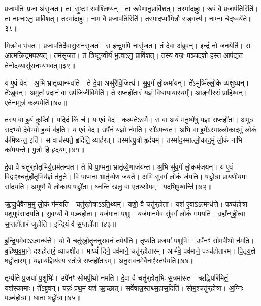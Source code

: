 प्र॒जा\-प॑तिः प्र॒जा अ॑\-सृजत।
ताः सृ॒ष्टाः सम॑श्लिष्यन्।
ता रू॒पेणानु॒प्रावि॑शत्।
तस्मा॑दाहुः।
रू॒पं वै प्र॒जा\-प॑ति॒रिति॑।
ता नाम्नाऽनु॒ प्रावि॑शत्।
तस्मा॑दाहुः।
नाम॒ वै प्र॒जा\-प॑ति॒रिति॑।
तस्मा॒दप्या॑मि॒त्रौ स॒ङ्गत्य॑।
नाम्ना॒ चेद्‌ध्वये॑ते॥३८॥\ip

मि॒त्रमे॒व भ॑वतः।
प्र॒जा\-प॑तिर्देवासु॒रान॑\-सृजत।
स इन्द्र॒मपि॒ नासृ॑जत।
तं दे॒वा अ॑ब्रुवन्।
इन्द्रं॑ नो जन॒येति॑।
स आ॒त्मन्निन्द्र॑मपश्यत्।
तम॑\-सृजत।
तं त्रि॒ष्टुग्वी॒र्यं॑ भू॒त्वाऽनु॒ प्रावि॑शत्।
तस्य॒ वज्रः॑ पञ्चद॒शो हस्त॒ आप॑द्यत।
तेनो॒दय्यासु॑रान॒भ्य॑भवत्॥३९॥\ip

य ए॒वं वेद॑।
अ॒भि भ्रातृ॑व्यान्भवति।
ते दे॒वा असु॑रैर्वि॒जित्य॑।
सु॒व॒र्गं लो॒कमा॑यन्।
ते॑ऽमुष्मिँ॑ल्लो॒के व्य॑क्षुध्यन्।
ते᳚ऽब्रुवन्।
अ॒मुतः॑ प्रदानं॒ वा उप॑जिजीवि॒मेति॑।
ते स॒प्तहो॑तारं य॒ज्ञं वि॒धाया॒यास्यम्᳚।
आ॒ङ्गी॒र॒सं प्राहि॑ण्वन्।
ए॒तेना॒मुत्र॑ कल्प॒येति॑॥४०॥\ip

तस्य॒ वा इ॒यं कॢप्तिः॑।
यदि॒दं किं च॑।
य ए॒वं वेद॑।
कल्प॑ते\-ऽस्मै।
स वा अ॒यं म॑नु॒ष्ये॑षु य॒ज्ञः स॒प्तहो॑ता।
अ॒मुत्र॑ स॒द्भ्यो दे॒वेभ्यो॑ ह॒व्यं व॑हति।
य ए॒वं वेद॑।
उपै॑नं य॒ज्ञो न॑मति।
सो॑ऽमन्यत।
अ॒भि वा इ॒मे᳚\-ऽस्माल्लो॒काद॒मुं लो॒कं क॑मिष्यन्त॒ इति॑।
स वाच॑स्पते॒ हृदिति॒ व्याह॑रत्।
तस्मा᳚त्पु॒त्रो हृद॑यम्।
तस्मा॑द॒स्माल्लो॒काद॒मुं लो॒कं नाभि का॑मयन्ते।
पु॒त्रो हि हृद॑यम्॥४१॥\ip\anuvakamend[ह्वये॑ते अभवत्कल्प॒येतीति॑ च॒त्वारि॑ च]

दे॒वा वै चतु॑र्‌\mbox{}होतृभिर्य॒ज्ञम॑तन्वत।
ते वि पा॒प्मना॒ भ्रातृ॑व्ये॒णाज॑यन्त।
अ॒भि सु॑व॒र्गं लो॒कम॑जयन्।
य ए॒वं वि॒द्वाꣴश्चतु॑र्\mbox{}होतृभिर्य॒ज्ञं त॑नु॒ते।
वि पा॒प्मना॒ भ्रातृ॑व्येण जयते।
अ॒भि सु॑व॒र्गं लो॒कं ज॑यति।
षड्ढो᳚त्रा प्राय॒णीय॒मा सा॑दयति।
अ॒मुष्मै॒ वै लो॒काय॒ षड्ढो॑ता।
घ्नन्ति॒ खलु॒ वा ए॒तथ्सोमम्᳚।
यद॑भिषु॒ण्वन्ति॑॥४२॥\ip

ऋ॒जु॒धैवैन॑म॒मुं लो॒कं ग॑मयति।
चतु॑र्‌\mbox{}होत्रा\-ऽऽति॒थ्यम्।
यशो॒ वै चतु॑र्‌\mbox{}होता।
यश॑ ए॒वाऽऽत्मन्ध॑त्ते।
पञ्च॑होत्रा प॒शुमुप॑सादयति।
सु॒व॒र्ग्यो॑ वै पञ्च॑होता।
यज॑मानः प॒शुः।
यज॑मानमे॒व सु॑व॒र्गं लो॒कं ग॑मयति।
ग्रहा᳚न्गृही॒त्वा स॒प्तहो॑तारं जुहोति।
इ॒न्द्रि॒यं वै स॒प्तहो॑ता॥४३॥\ip

इ॒न्द्रि॒यमे॒वाऽऽत्मन्ध॑त्ते।
यो वै चतु॑र्‌\mbox{}होतॄननुसव॒नं त॒र्पय॑ति।
तृप्य॑ति प्र॒जया॑ प॒शुभिः॑।
उपै॑नꣳ सोमपी॒थो न॑मति।
ब॒हि॒ष्प॒व॒मा॒ने दश॑होतारं॒ व्याच॑क्षीत।
माध्यं॑ दिने॒ पव॑माने॒ चतु॑र्‌\mbox{}होतारम्।
आर्भ॑वे॒ पव॑माने॒ पञ्च॑होतारम्।
पि॒तृ॒य॒ज्ञे षड्ढो॑तारम्।
य॒ज्ञा॒य॒ज्ञिय॑स्य स्तो॒त्रे स॒प्तहो॑तारम्।
अ॒नु॒स॒व॒नमे॒वैनाꣴ॑स्तर्पयति॥४४॥\ip

तृप्य॑ति प्र॒जया॑ प॒शुभिः॑।
उपै॑नꣳ सोमपी॒थो न॑मति।
दे॒वा वै चतु॑र्‌\mbox{}होतृभिः स॒त्रमा॑सत।
ऋद्धि॑परिमितं॒ यश॑स्कामाः।
ते᳚ऽब्रुवन्।
यन्नः॑ प्रथ॒मं यश॑ ऋ॒च्छात्।
सर्वे॑षान्न॒स्तथ्स॒हास॒दिति॑।
सोम॒श्चतु॑र्‌\mbox{}होत्रा।
अ॒ग्निः पञ्च॑होत्रा।
धा॒ता षड्ढो᳚त्रा॥४५॥\ip

